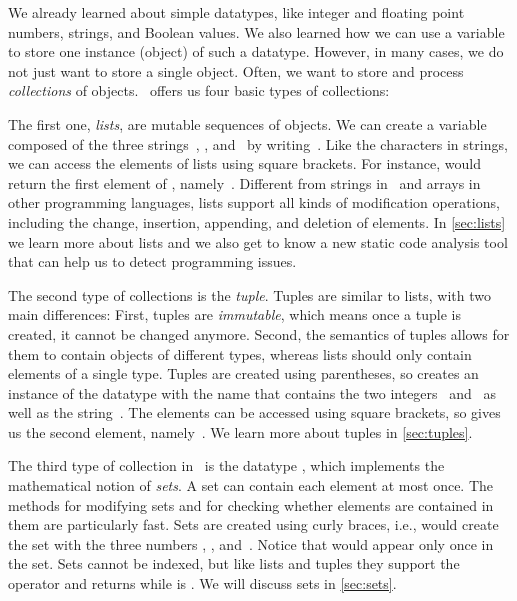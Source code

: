 %
\label{sec:collections}%
%
We already learned about simple datatypes, like integer and floating point numbers, strings, and Boolean values.
We also learned how we can use a variable to store one instance (object) of such a datatype.
However, in many cases, we do not just want to store a single object.
Often, we want to store and process \emph{collections} of objects.
\python\ offers us four basic types of collections:

The first one, \emph{lists}, are mutable sequences of objects.
We can create a  variable~ composed of the three strings~, , and~ by writing~.
Like the characters in strings, we can access the elements of lists using square brackets.
For instance,  would return the first element of , namely~.
Different from strings in \python\ and arrays in other programming languages, lists support all kinds of modification operations, including the change, insertion, appending, and deletion of elements.
In \cref{sec:lists} we learn more about lists and we also get to know a new static code analysis tool that can help us to detect programming issues.

The second type of collections is the \emph{tuple}.
Tuples are similar to lists, with two main differences:
First, tuples are \emph{immutable}, which means once a tuple is created, it cannot be changed anymore.
Second, the semantics of tuples allows for them to contain objects of different types, whereas lists should only contain elements of a single type.
Tuples are created using parentheses, so  creates an instance of the datatype  with the name  that contains the two integers~ and~ as well as the string~.
The elements can be accessed using square brackets, so  gives us the second element, namely~.
We learn more about tuples in \cref{sec:tuples}.

The third type of collection in \python\ is the datatype , which implements the mathematical notion of \emph{sets}.
A set can contain each element at most once.
The methods for modifying sets and for checking whether elements are contained in them are particularly fast.
Sets are created using curly braces, i.e.,  would create the set  with the three numbers , , and~.
Notice that  would appear only once in the set.
Sets cannot be indexed, but like lists and tuples they support the  operator and  returns  while  is .
We will discuss sets in \cref{sec:sets}.

